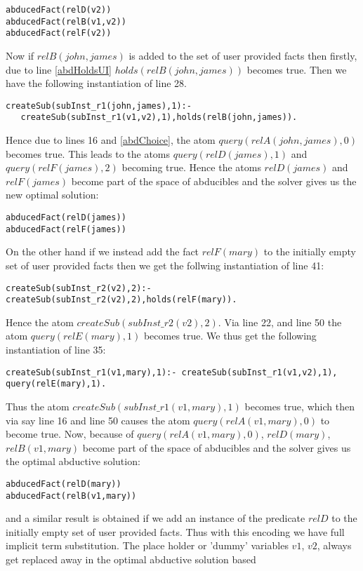 \documentclass[sigconf]{acmart}
\begin{document}
\begin{lstlisting}[frame=none]
abducedFact(relD(v2)) 
abducedFact(relB(v1,v2)) 
abducedFact(relF(v2))    
\end{lstlisting}
Now if $relB(john,james)$ is added to the set of user provided facts then firstly, due to line \ref{abdHoldsUI} $holds(relB(john,james))$ becomes true. Then we have the following instantiation of line 28.
\begin{lstlisting}[frame=none]
createSub(subInst_r1(john,james),1):-
   createSub(subInst_r1(v1,v2),1),holds(relB(john,james)). 
\end{lstlisting}
Hence due to lines 16 and \ref{abdChoice}, the atom
$query(relA(john,james),0)$ becomes true. This leads to the atoms
$query(relD(james),1)$ and $query(relF(james),2)$ becoming true. Hence the atoms $relD(james)$ and $relF(james)$ become part of the space of abducibles and the solver gives us the new optimal solution:
\begin{verbatim}
abducedFact(relD(james)) 
abducedFact(relF(james)) 
\end{verbatim}
On the other hand if we instead add the fact $relF(mary)$ to the initially empty set of user provided facts then we get the follwing instantiation of line 41:
\begin{verbatim}
createSub(subInst_r2(v2),2):-createSub(subInst_r2(v2),2),holds(relF(mary)).    
\end{verbatim}
Hence the atom $createSub(subInst\_r2(v2),2)$. Via line 22, and line 50 the atom $query(relE(mary),1)$ becomes true. We thus get the following instantiation of line 35:
\begin{verbatim}
createSub(subInst_r1(v1,mary),1):- createSub(subInst_r1(v1,v2),1), query(relE(mary),1).   
\end{verbatim}
Thus the atom $createSub(subInst\_r1(v1,mary),1)$ becomes true, which then via say line 16 and line 50 causes the atom $query(relA(v1,mary),0)$ to become true. Now, because of $query(relA(v1,mary),0)$, $relD(mary)$, $relB(v1,mary)$ become part of the space of abducibles and the solver gives us the optimal abductive solution: 
\begin{verbatim}
abducedFact(relD(mary)) 
abducedFact(relB(v1,mary))
\end{verbatim}
and a similar result is obtained if we add an instance of the predicate $relD$
to the initially empty set of user provided facts. Thus with this encoding we
have full implicit term substitution. The place holder or 'dummy' variables
$v1$, $v2$, always get replaced away in the optimal abductive solution based
\end{document}
